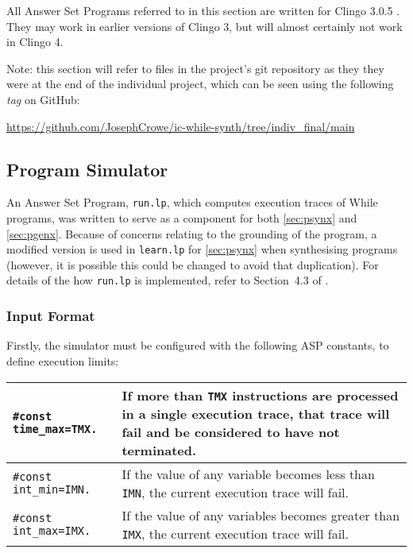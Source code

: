 \documentclass[a4paper,twoside,notitlepage,12pt]{article}
\begin{document}
All Answer Set Programs referred to in this section are written for Clingo 3.0.5 
\cite{clingo3}. They may work in earlier versions of Clingo 3, but will almost
certainly not work in Clingo 4.

Note: this section will refer to files in the project's git repository as they they 
were at the end of the individual project, which can be seen using the following 
\emph{tag} on GitHub:

\begin{center} 
    \url{https://github.com/JosephCrowe/ic-while-synth/tree/indiv_final/main}
\end{center}

\subsection{Program Simulator}

An Answer Set Program, \verb|run.lp|, which computes execution traces of While 
programs, was written to serve as a component for both \ref{sec:psynx} and 
\ref{sec:pgenx}. Because of concerns relating to the grounding of the program, a 
modified version is used in \verb|learn.lp| for \ref{sec:psynx} when synthesising 
programs (however, it is possible this could be changed to avoid that duplication). For 
details of the how \verb|run.lp| is implemented, refer to Section~4.3 of \cite{final}.

\subsubsection{Input Format}

Firstly, the simulator must be configured with the following ASP constants, to define 
execution limits:

\begin{tabularx}{\textwidth}{|l|X|}
\hline
\verb|#const time_max=TMX.| &
If more than \verb|TMX| instructions are processed in a single execution trace, that 
trace will fail and be considered to have not terminated. \\
\hline
\verb|#const int_min=IMN.| &
If the value of any variable becomes less than \verb|IMN|, the current execution trace 
will fail. \\
\hline
\verb|#const int_max=IMX.| &
If the value of any variables becomes greater than \verb|IMX|, the current execution 
trace will fail. \\
\hline
\end{tabularx}
\end{document}
